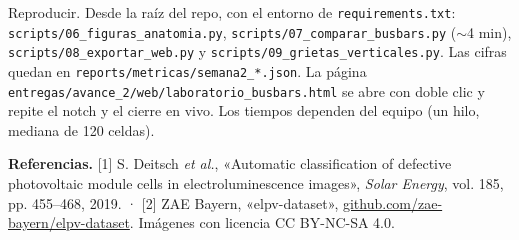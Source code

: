 \documentclass[10pt,a4paper]{article}
\begin{document}
\vspace{4pt}
\begin{ojo}{Reproducir.}
Desde la raíz del repo, con el entorno de \texttt{requirements.txt}: \texttt{scripts/06\_figuras\_anatomia.py}, \texttt{scripts/07\_comparar\_busbars.py} ($\sim$4 min),
\texttt{scripts/08\_exportar\_web.py} y \texttt{scripts/09\_grietas\_verticales.py}. Las cifras quedan en \texttt{reports/metricas/semana2\_*.json}. La página
\texttt{entregas/avance\_2/web/laboratorio\_busbars.html} se abre con doble clic y repite el notch y el cierre en vivo. Los tiempos dependen del equipo (un hilo, mediana de 120 celdas).
\end{ojo}

{\small
\sloppy\textbf{Referencias.}
[1] S. Deitsch \emph{et al.}, «Automatic classification of defective photovoltaic module cells in electroluminescence images», \emph{Solar Energy}, vol. 185,
pp. 455–468, 2019. ·
[2] ZAE Bayern, «elpv-dataset», \url{github.com/zae-bayern/elpv-dataset}. Imágenes con licencia CC BY-NC-SA 4.0.
}
\end{document}
